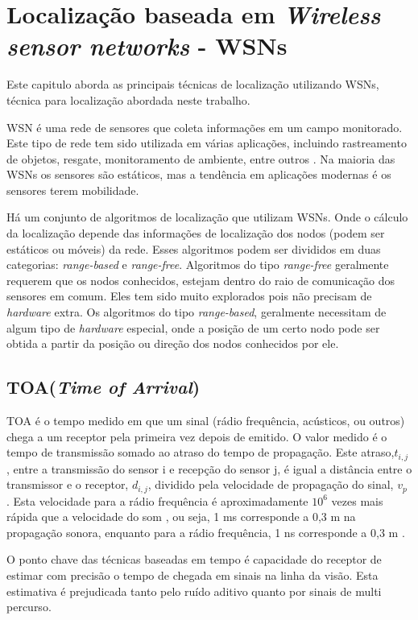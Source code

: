 \chapter{Localização baseada em \textit{Wireless sensor networks} - WSNs}

Este capitulo aborda as principais técnicas de localização utilizando WSNs, técnica para localização 
abordada neste trabalho.

\label{wsn}
	WSN é uma rede de sensores que coleta informações em um campo monitorado. Este tipo de rede tem sido utilizada em 
	várias aplicações, incluindo rastreamento de objetos, resgate, monitoramento de ambiente, entre outros \cite{omc}.
	Na maioria das WSNs os sensores são estáticos, mas a tendência em aplicações modernas é os sensores terem mobilidade.
	
	Há um conjunto de algoritmos de localização que utilizam WSNs. Onde o cálculo da localização depende das informações 
	de localização dos nodos (podem ser estáticos ou móveis) da rede. Esses algoritmos podem ser divididos em duas categorias: \textit{range-based}
	e \textit{range-free}. Algoritmos do tipo \textit{range-free} \cite{omc} \cite{wsnsLinear} geralmente requerem que os nodos conhecidos, estejam dentro 
	do raio de comunicação dos sensores em comum. Eles tem sido muito explorados pois não precisam de \textit{hardware} extra. Os algoritmos do tipo \textit{range-based},
	geralmente necessitam de algum tipo de \textit{hardware} especial, onde a posição de um certo nodo pode ser obtida a partir da posição ou direção dos nodos conhecidos por ele.
	
\section{TOA(\textit{Time of Arrival})}
	TOA é o tempo medido em que um sinal (rádio frequência, acústicos, ou outros) chega a um
receptor pela primeira vez depois de emitido\cite{gps}. O valor medido é o tempo de transmissão somado ao
atraso do tempo de propagação. Este atraso,$t_{i,j}$
, entre a transmissão do sensor i e recepção do sensor j, é igual a distância entre o transmissor e o receptor, 
$d_{i,j}$, dividido pela velocidade de propagação do sinal, $v_{p}$
. Esta velocidade para a rádio frequência é aproximadamente $10^{6}$  vezes mais rápida que a velocidade do som \cite{gps},
ou seja, 1 ms corresponde a 0,3 m na propagação sonora, enquanto para a rádio frequência, 1 ns corresponde a 0,3 m \cite{gps}.

O ponto chave das técnicas baseadas em tempo é capacidade do receptor de
estimar com precisão o tempo de chegada em sinais na linha da visão. Esta estimativa é prejudicada tanto pelo ruído 
aditivo quanto por sinais de multi percurso.

